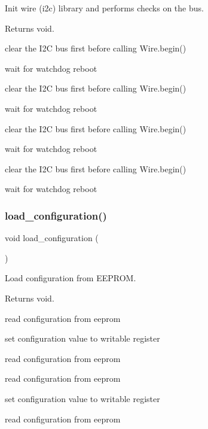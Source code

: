 Init wire (i2c) library and performs checks on the bus. 

\begin{DoxyReturn}{Returns}
void. 
\end{DoxyReturn}
clear the I2C bus first before calling Wire.\+begin()

wait for watchdog reboot

clear the I2C bus first before calling Wire.\+begin()

wait for watchdog reboot

clear the I2C bus first before calling Wire.\+begin()

wait for watchdog reboot

clear the I2C bus first before calling Wire.\+begin()

wait for watchdog reboot \mbox{\label{i2c-th_8h_a1be652e7d942160a14a560e0be837358}} 
\subsubsection{\texorpdfstring{load\+\_\+configuration()}{load\_configuration()}}
{\footnotesize\ttfamily void load\+\_\+configuration (\begin{DoxyParamCaption}{ }\end{DoxyParamCaption})}



Load configuration from E\+E\+P\+R\+OM. 

\begin{DoxyReturn}{Returns}
void. 
\end{DoxyReturn}
read configuration from eeprom

set configuration value to writable register

read configuration from eeprom

read configuration from eeprom

set configuration value to writable register

read configuration from eeprom \mbox{\label{i2c-th_8h_a1c5769e114267b210fb3812064d01dd0}} 
